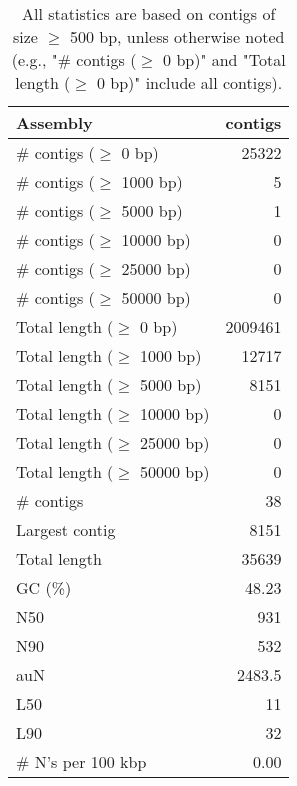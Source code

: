\documentclass[12pt,a4paper]{article}
\begin{document}
\begin{table}[ht]
\begin{center}
\caption{All statistics are based on contigs of size $\geq$ 500 bp, unless otherwise noted (e.g., "\# contigs ($\geq$ 0 bp)" and "Total length ($\geq$ 0 bp)" include all contigs).}
\begin{tabular}{|l*{1}{|r}|}
\hline
Assembly & contigs \\ \hline
\# contigs ($\geq$ 0 bp) & 25322 \\ \hline
\# contigs ($\geq$ 1000 bp) & 5 \\ \hline
\# contigs ($\geq$ 5000 bp) & 1 \\ \hline
\# contigs ($\geq$ 10000 bp) & 0 \\ \hline
\# contigs ($\geq$ 25000 bp) & 0 \\ \hline
\# contigs ($\geq$ 50000 bp) & 0 \\ \hline
Total length ($\geq$ 0 bp) & 2009461 \\ \hline
Total length ($\geq$ 1000 bp) & 12717 \\ \hline
Total length ($\geq$ 5000 bp) & 8151 \\ \hline
Total length ($\geq$ 10000 bp) & 0 \\ \hline
Total length ($\geq$ 25000 bp) & 0 \\ \hline
Total length ($\geq$ 50000 bp) & 0 \\ \hline
\# contigs & 38 \\ \hline
Largest contig & 8151 \\ \hline
Total length & 35639 \\ \hline
GC (\%) & 48.23 \\ \hline
N50 & 931 \\ \hline
N90 & 532 \\ \hline
auN & 2483.5 \\ \hline
L50 & 11 \\ \hline
L90 & 32 \\ \hline
\# N's per 100 kbp & 0.00 \\ \hline
\end{tabular}
\end{center}
\end{table}
\end{document}
